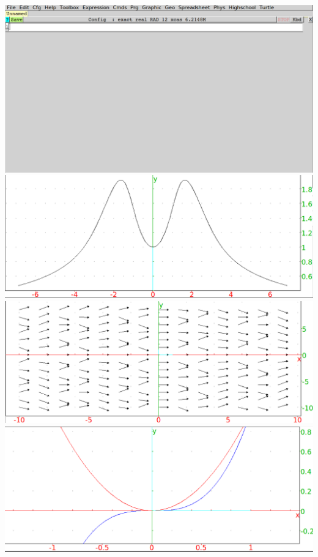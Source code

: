 \documentclass{article}
\begin{document}
\clearpage%
\includegraphics[width=\textwidth]{xcas-open.png}
\clearpage%
\includegraphics[width=\textwidth]{xcas-plotode.png}
\clearpage%
\includegraphics[width=\textwidth]{xcas-plotfield.png}
\clearpage%
\includegraphics[width=\textwidth]{xcas-plot.png}
\clearpage%
\end{document}
